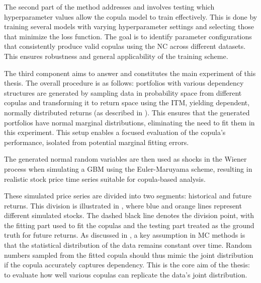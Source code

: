 The second part of the method addresses \RQtwo and involves testing which hyperparameter values allow the copula model to train effectively. This is done by training several models with varying hyperparameter settings and selecting those that minimize the loss function. The goal is to identify parameter configurations that consistently produce valid copulas using the \gls{NC} across different datasets. This ensures robustness and general applicability of the training scheme.

The third component aims to answer \RQthree and constitutes the main experiment of this thesis. The overall procedure is as follows: portfolios with various dependency structures are generated by sampling data in probability space from different copulas and transforming it to return space using the \gls{ITM}, yielding dependent, normally distributed returns (as described in ). This ensures that the generated portfolios have normal marginal distributions, eliminating the need to fit them in this experiment. This setup enables a focused evaluation of the copula's performance, isolated from potential marginal fitting errors.

The generated normal random variables are then used as shocks in the Wiener process when simulating a \gls{GBM} using the Euler-Maruyama scheme, resulting in realistic stock price time series suitable for copula-based analysis.

These simulated price series are divided into two segments: historical and future returns. This division is illustrated in , where blue and orange lines represent different simulated stocks. The dashed black line denotes the division point, with the fitting part used to fit the copulas and the testing part treated as the ground truth for future returns. As discussed in , a key assumption in \gls{MC} methods is that the statistical distribution of the data remains constant over time. Random numbers sampled from the fitted copula should thus mimic the joint distribution if the copula accurately captures dependency. This is the core aim of the thesis: to evaluate how well various copulas can replicate the data’s joint distribution.

